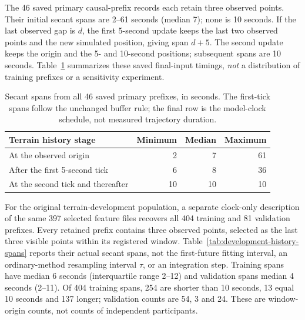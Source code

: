 \documentclass[11pt]{article}
\begin{document}
The 46 saved primary causal-prefix records each retain three observed points.
Their initial secant spans are 2--61 seconds (median 7); none is 10 seconds.
If the last observed gap is \(d\), the first 5-second update keeps the last
two observed points and the new simulated position, giving span \(d+5\).
The second update keeps the origin and the 5- and 10-second positions;
subsequent spans are 10 seconds. Table~\ref{tab:history-spans} summarizes
these saved final-input timings, \emph{not} a distribution of training
prefixes or a sensitivity experiment.

\begin{table}[htbp]
\centering\small
\caption{Secant spans from all 46 saved primary prefixes, in seconds.
The first-tick spans follow the unchanged buffer rule; the final row is
the model-clock schedule, not measured trajectory duration.}
\label{tab:history-spans}
\begin{tabular}{lrrr}
\toprule
Terrain history stage & Minimum & Median & Maximum\\
\midrule
At the observed origin & 2 & 7 & 61\\
After the first 5-second tick & 6 & 8 & 36\\
At the second tick and thereafter & 10 & 10 & 10\\
\bottomrule
\end{tabular}
\end{table}

For the original terrain-development population, a separate clock-only
description of the same 397 selected feature files recovers all 404 training
and 81 validation prefixes. Every retained prefix contains three observed
points, selected as the last three visible points within its registered
window. Table~\ref{tab:development-history-spans} reports their actual secant
spans, not the first-future fitting interval, an ordinary-method resampling
interval \(\tau\), or an integration step. Training spans have median
6 seconds (interquartile range 2--12) and validation spans median 4 seconds
(2--11). Of 404 training spans, 254 are shorter than 10 seconds, 13 equal
10 seconds and 137 longer; validation counts are 54, 3 and 24. These are
window-origin counts, not counts of independent participants.
\end{document}
